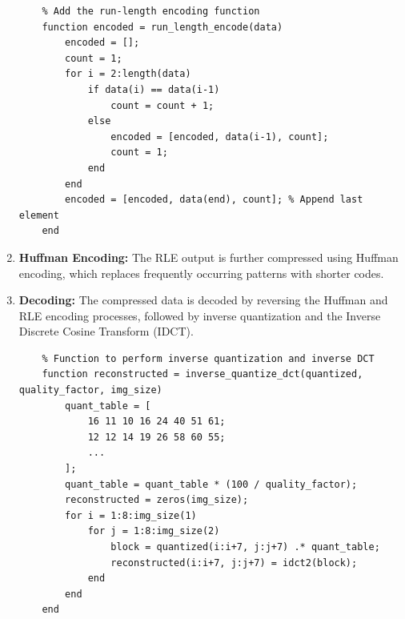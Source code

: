 \documentclass{article}
\begin{document}
\begin{enumerate}
    \begin{lstlisting}
    % Add the run-length encoding function
    function encoded = run_length_encode(data)
        encoded = [];
        count = 1;
        for i = 2:length(data)
            if data(i) == data(i-1)
                count = count + 1;
            else
                encoded = [encoded, data(i-1), count];
                count = 1;
            end
        end
        encoded = [encoded, data(end), count]; % Append last element
    end
    \end{lstlisting}
    
    \item \textbf{Huffman Encoding:}
    The RLE output is further compressed using Huffman encoding, which replaces frequently occurring patterns with shorter codes.
    
    \item \textbf{Decoding:}
    The compressed data is decoded by reversing the Huffman and RLE encoding processes, followed by inverse quantization and the Inverse Discrete Cosine Transform (IDCT).

    \begin{lstlisting}
    % Function to perform inverse quantization and inverse DCT
    function reconstructed = inverse_quantize_dct(quantized, quality_factor, img_size)
        quant_table = [
            16 11 10 16 24 40 51 61;
            12 12 14 19 26 58 60 55;
            ...
        ];
        quant_table = quant_table * (100 / quality_factor);
        reconstructed = zeros(img_size);
        for i = 1:8:img_size(1)
            for j = 1:8:img_size(2)
                block = quantized(i:i+7, j:j+7) .* quant_table;
                reconstructed(i:i+7, j:j+7) = idct2(block);
            end
        end
    end
    \end{lstlisting}
\end{enumerate}


\end{document}
